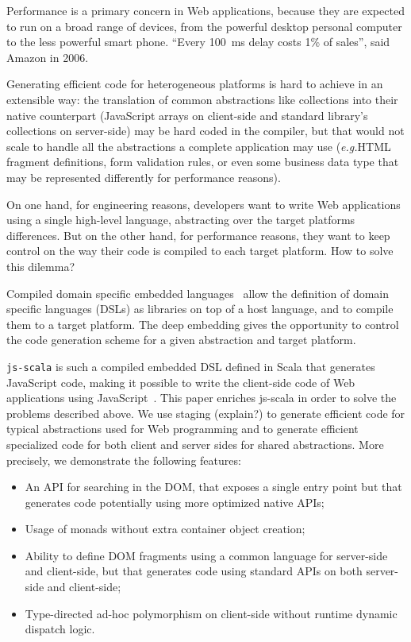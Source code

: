 \documentclass[preprint]{sigplanconf}
\newcommand{\eg}{\emph{e.g.}}
\begin{document}
Performance is a primary concern in Web applications, because they are expected to run on a broad range of devices,
from the powerful desktop personal computer to the less powerful smart phone. “Every 100~ms delay costs 1\% of
sales”, said Amazon in 2006.

Generating efficient code for heterogeneous platforms is hard to achieve in an extensible way: the translation of
common abstractions like collections into their native counterpart (JavaScript arrays on client-side and standard
library's collections on server-side) may be hard coded in the compiler, but that would not scale to handle all the
abstractions a complete application may use (\eg HTML fragment definitions, form validation rules, or even some
business data type that may be represented differently for performance reasons).

On one hand, for engineering reasons, developers want to write Web applications using a single high-level language,
abstracting over the target platforms differences. But on the other hand, for performance reasons, they want to keep
control on the way their code is compiled to each target platform. How to solve this dilemma?

Compiled domain specific embedded languages~\cite{Elliott2003_Compiling} allow the definition of domain specific
languages (DSLs) as libraries on top of a host language, and to compile them to a target platform. The deep embedding
gives the opportunity to control the code generation scheme for a given abstraction and target platform.

\texttt{js-scala} is such a compiled embedded DSL defined in Scala that generates JavaScript code, making it possible
to write the client-side code of Web applications using JavaScript~\cite{Kossakowski12_JsDESL}. This paper
enriches js-scala in order to solve the problems described above. We use staging (explain?) to generate efficient
code for typical abstractions used for Web programming and to generate efficient specialized code for both client and
server sides for shared abstractions. More precisely, we demonstrate the following features:

\begin{itemize}
 \item An API for searching in the DOM, that exposes a single entry point but that generates code potentially using
more optimized native APIs;
 \item Usage of monads without extra container object creation;
 \item Ability to define DOM fragments using a common language for server-side and client-side, but that generates
code using standard APIs on both server-side and client-side;
 \item Type-directed ad-hoc polymorphism on client-side without runtime dynamic dispatch logic.
\end{itemize}
\end{document}
